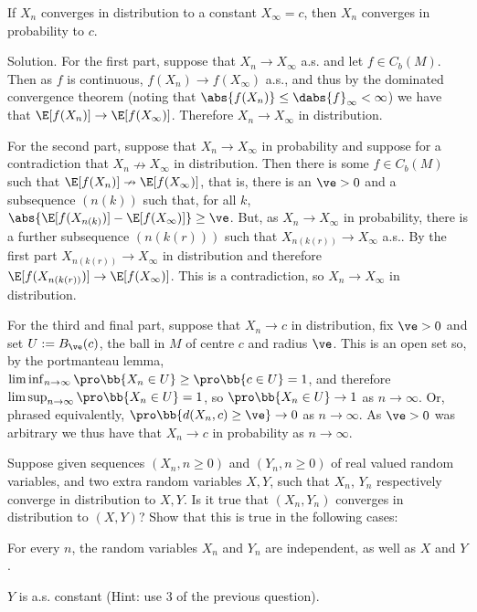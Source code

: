 \item [(iii)] If $X_n$ converges in distribution to a constant $X_\infty = c$, then $X_n$ converges in probability to $c$.
\een

\scutline

Solution. For the first part, suppose that $X_n \to X_\infty$ a.s. and let $f \in C_b(M)$. Then as $f$ is continuous, $f(X_n)\to f(X_\infty)$ a.s., and thus by the dominated convergence theorem (noting that $\abs{ f (X_n)} \leq \dabs{f}_\infty < \infty$) we have that $\E[ f(X_n)]\to \E[ f (X_\infty)]$. Therefore $X_n \to X_\infty$ in distribution.

For the second part, suppose that $X_n\to X_\infty$ in probability and suppose for a contradiction that $X_n \nrightarrow X_\infty$ in distribution. Then there is some $f \in C_b(M)$ such that $\E[ f(X_n)] \nrightarrow \E[ f (X_\infty)]$, that is, there is an $\ve > 0$ and a subsequence $(n(k))$ such that, for all $k$, $\abs{\E[ f (X_{n(k)})]-\E[ f(X_\infty)]} \geq \ve$. But, as $X_n \to X_\infty$ in probability, there is a further subsequence $(n(k(r)))$ such that $X_{n(k(r))} \to X_\infty$ a.s.. By the first part $X_{n(k(r))} \to X_\infty$ in distribution and therefore $\E[ f (X_{n(k(r))})]\to \E[ f (X_\infty)]$. This is a contradiction, so $X_n \to X_\infty$ in distribution.

For the third and final part, suppose that $X_n\to c$ in distribution, fix $\ve >0$ and set $U := B_\ve (c)$, the ball in $M$ of centre $c$ and radius $\ve$. This is an open set so, by the portmanteau lemma, $\liminf_{n\to \infty} \pro\bb{X_n \in U} \geq \pro\bb{c \in U} = 1$, and therefore $\limsup_{n\to \infty} \pro\bb{X_n \in U} = 1$, so $\pro\bb{X_n \in U} \to 1$ as $n \to \infty$. Or, phrased equivalently, $\pro\bb{d(X_n,c) \geq \ve} \to 0$ as $n \to \infty$. As $\ve > 0$ was arbitrary we thus have that $X_n \to c$ in probability as $n\to \infty$.

\vspace{2mm}

\qcutline


\item Suppose given sequences $(X_n, n \geq  0)$ and $(Y_n, n \geq  0)$ of real valued random variables, and two extra random variables $X,Y$, such that $X_n$, $Y_n$ respectively converge in distribution to $X, Y$. Is it true that $(X_n, Y_n)$ converges in distribution to $(X, Y)$? Show that this is true in the following cases:
\ben
\item [(i)] For every $n$, the random variables $X_n$ and $Y_n$ are independent, as well as $X$ and $Y$.
\item [(ii)] $Y$ is a.s. constant (Hint: use 3 of the previous question).
\een

